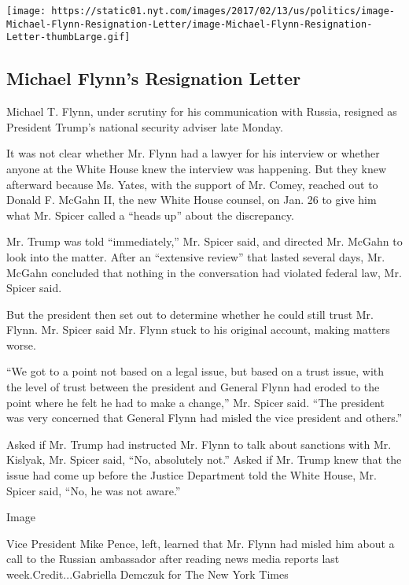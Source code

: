 \href{https://www.nytimes.com/interactive/2017/02/13/us/politics/document-Michael-Flynn-Resignation-Letter.html}{}

\texttt{[image: https://static01.nyt.com/images/2017/02/13/us/politics/image-Michael-Flynn-Resignation-Letter/image-Michael-Flynn-Resignation-Letter-thumbLarge.gif]}

\hypertarget{michael-flynns-resignation-letter}{%
\subsection{Michael Flynn's Resignation
Letter}\label{michael-flynns-resignation-letter}}

Michael T. Flynn, under scrutiny for his communication with Russia,
resigned as President Trump's national security adviser late Monday.

It was not clear whether Mr. Flynn had a lawyer for his interview or
whether anyone at the White House knew the interview was happening. But
they knew afterward because Ms. Yates, with the support of Mr. Comey,
reached out to Donald F. McGahn II, the new White House counsel, on Jan.
26 to give him what Mr. Spicer called a ``heads up'' about the
discrepancy.

Mr. Trump was told ``immediately,'' Mr. Spicer said, and directed Mr.
McGahn to look into the matter. After an ``extensive review'' that
lasted several days, Mr. McGahn concluded that nothing in the
conversation had violated federal law, Mr. Spicer said.

But the president then set out to determine whether he could still trust
Mr. Flynn. Mr. Spicer said Mr. Flynn stuck to his original account,
making matters worse.

``We got to a point not based on a legal issue, but based on a trust
issue, with the level of trust between the president and General Flynn
had eroded to the point where he felt he had to make a change,'' Mr.
Spicer said. ``The president was very concerned that General Flynn had
misled the vice president and others.''

Asked if Mr. Trump had instructed Mr. Flynn to talk about sanctions with
Mr. Kislyak, Mr. Spicer said, ``No, absolutely not.'' Asked if Mr. Trump
knew that the issue had come up before the Justice Department told the
White House, Mr. Spicer said, ``No, he was not aware.''

Image

Vice President Mike Pence, left, learned that Mr. Flynn had misled him
about a call to the Russian ambassador after reading news media reports
last week.Credit...Gabriella Demczuk for The New York Times

